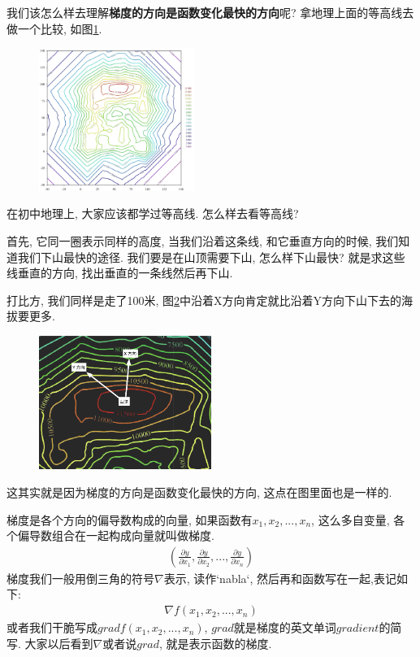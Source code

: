 我们该怎么样去理解\textbf{梯度的方向是函数变化最快的方向}呢? 拿地理上面的等高线去做一个比较, 如图\ref{fig:img13_1}. 

\begin{figure}[ht]
  \centering
  \includegraphics[width=0.45\textwidth]{asset/20230901221656.png}
  \caption{}
  \label{fig:img13_1}
\end{figure}

在初中地理上, 大家应该都学过等高线. 怎么样去看等高线? 

首先, 它同一圈表示同样的高度, 当我们沿着这条线, 和它垂直方向的时候, 我们知道我们下山最快的途径. 我们要是在山顶需要下山, 怎么样下山最快? 就是求这些线垂直的方向, 找出垂直的一条线然后再下山. 

打比方, 我们同样是走了100米, 图\ref{fig:img13_2}中沿着X方向肯定就比沿着Y方向下山下去的海拔要更多. 

\begin{figure}[ht]
  \centering
  \includegraphics[width=0.5\textwidth]{asset/20230901223615.png}
  \caption{}
  \label{fig:img13_2}
\end{figure}

这其实就是因为梯度的方向是函数变化最快的方向, 这点在图里面也是一样的. 

梯度是各个方向的偏导数构成的向量, 如果函数有$x_1, x_2,..., x_n$, 这么多自变量, 各个偏导数组合在一起构成向量就叫做梯度. 
\begin{align*}
  (\frac{\partial y}{\partial x_1},\frac{\partial y}{\partial x_2},..., \frac{\partial y}{\partial x_n})
\end{align*}
梯度我们一般用倒三角的符号$\nabla$表示, 读作`nabla`, 然后再和函数写在一起,表记如下:
\begin{align*}
  \nabla f(x_1, x_2, ..., x_n)
\end{align*}
或者我们干脆写成$grad f(x_1, x_2, ..., x_n)$,  $\mathord{grad}$就是梯度的英文单词$\mathord{gradient}$的简写. 大家以后看到$\nabla$或者说$grad$, 就是表示函数的梯度. 


